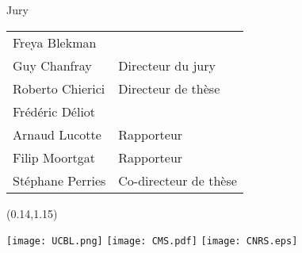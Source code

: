 \begin{titlepage}
\begin{center} \small
Jury \\
\begin{tabular}{L{5cm}l}
Freya Blekman & \\
Guy Chanfray & Directeur du jury \\
Roberto Chierici & Directeur de thèse \\
Frédéric Déliot & \\
Arnaud Lucotte & Rapporteur \\
Filip Moortgat & Rapporteur \\
Stéphane Perries & Co-directeur de thèse
\end{tabular}

\end{center}

\vfill

\begin{textblock}{1}(0.14,1.15)
\begin{center}
\texttt{[image: UCBL.png]} \hspace{1cm}  \hspace{1cm} \texttt{[image: CMS.pdf]} \hspace{1cm} \texttt{[image: CNRS.eps]}
\end{center}
\end{textblock}

\end{titlepage}